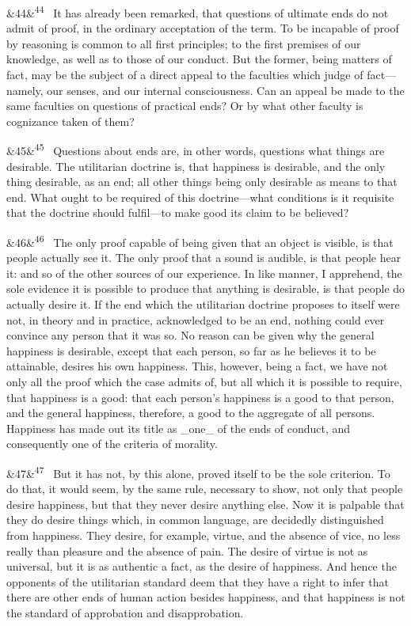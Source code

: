 \documentclass[12pt]{article}
\newcommand{\para}[1][]{\par\noindent\ifx&#1&\else\textsuperscript{\footnotesize #1}~\fi}
\begin{document}
\para[44] It has already been remarked, that questions of ultimate ends do not admit of proof, in the ordinary acceptation of the term. To be incapable of proof by reasoning is common to all first principles; to the first premises of our knowledge, as well as to those of our conduct. But the former, being matters of fact, may be the subject of a direct appeal to the faculties which judge of fact---namely, our senses, and our internal consciousness. Can an appeal be made to the same faculties on questions of practical ends? Or by what other faculty is cognizance taken of them?

\para[45] Questions about ends are, in other words, questions what things are desirable. The utilitarian doctrine is, that happiness is desirable, and the only thing desirable, as an end; all other things being only desirable as means to that end. What ought to be required of this doctrine---what conditions is it requisite that the doctrine should fulfil---to make good its claim to be believed?

\para[46] The only proof capable of being given that an object is visible, is that people actually see it. The only proof that a sound is audible, is that people hear it: and so of the other sources of our experience. In like manner, I apprehend, the sole evidence it is possible to produce that anything is desirable, is that people do actually desire it. If the end which the utilitarian doctrine proposes to itself were not, in theory and in practice, acknowledged to be an end, nothing could ever convince any person that it was so. No reason can be given why the general happiness is desirable, except that each person, so far as he believes it to be attainable, desires his own happiness. This, however, being a fact, we have not only all the proof which the case admits of, but all which it is possible to require, that happiness is a good: that each person's happiness is a good to that person, and the general happiness, therefore, a good to the aggregate of all persons. Happiness has made out its title as \_one\_ of the ends of conduct, and consequently one of the criteria of morality.

\para[47] But it has not, by this alone, proved itself to be the sole criterion. To do that, it would seem, by the same rule, necessary to show, not only that people desire happiness, but that they never desire anything else. Now it is palpable that they do desire things which, in common language, are decidedly distinguished from happiness. They desire, for example, virtue, and the absence of vice, no less really than pleasure and the absence of pain. The desire of virtue is not as universal, but it is as authentic a fact, as the desire of happiness. And hence the opponents of the utilitarian standard deem that they have a right to infer that there are other ends of human action besides happiness, and that happiness is not the standard of approbation and disapprobation.
\end{document}
